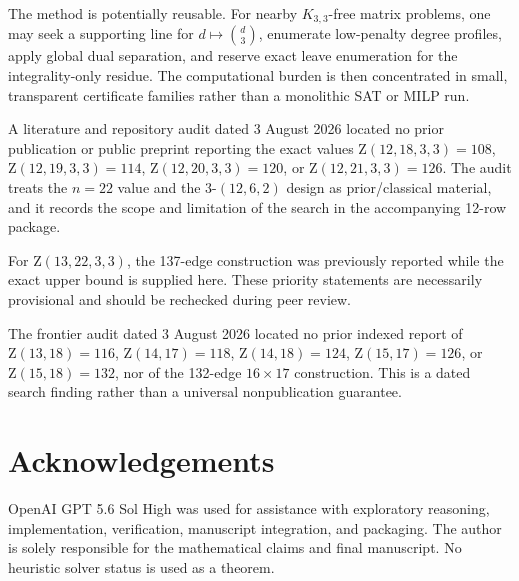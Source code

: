 \documentclass[10pt,a4paper]{amsart}
\newcommand{\Z}{\mathrm Z}
\begin{document}
The method is potentially reusable. For nearby $K_{3,3}$-free matrix problems, one may seek a supporting line for $d\mapsto\binom d3$, enumerate low-penalty degree profiles, apply global dual separation, and reserve exact leave enumeration for the integrality-only residue. The computational burden is then concentrated in small, transparent certificate families rather than a monolithic SAT or MILP run.

\sloppy
A literature and repository audit dated 3 August 2026 located no prior
publication or public preprint reporting the exact values
$\Z(12,18,3,3)=108$, $\Z(12,19,3,3)=114$, $\Z(12,20,3,3)=120$, or
$\Z(12,21,3,3)=126$. The audit treats the $n=22$ value and the
3-$(12,6,2)$ design as prior/classical material, and it records the scope and
limitation of the search in the accompanying 12-row package.

For $\Z(13,22,3,3)$, the 137-edge construction was previously reported while
the exact upper bound is supplied here. These priority statements are
necessarily provisional and should be rechecked during peer review.

The frontier audit dated 3 August 2026 located no prior indexed report of
$\Z(13,18)=116$, $\Z(14,17)=118$, $\Z(14,18)=124$, $\Z(15,17)=126$, or
$\Z(15,18)=132$, nor of the 132-edge $16\times17$ construction. This is a
dated search finding rather than a universal nonpublication guarantee.
\fussy

\section*{Acknowledgements}
OpenAI GPT 5.6 Sol High was used for assistance with exploratory reasoning,
implementation, verification, manuscript integration, and packaging. The
author is solely responsible for the mathematical claims and final manuscript.
No heuristic solver status is used as a theorem.

\appendix
\end{document}
